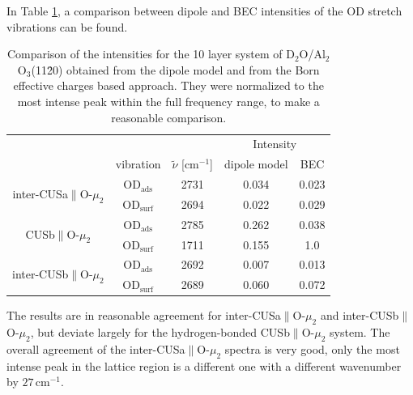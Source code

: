 \documentclass[11pt,DIV=13,BCOR=5mm,a4paper,headinclude]{scrbook}
\begin{document}
In Table \ref{tab:freq_lowcov_comp}, a comparison between dipole and BEC intensities of the OD stretch vibrations can be found.
\begin{table}[!h]
\centering
\caption{Comparison of the intensities for the 10 layer system of D$_2$O/Al$_2$O$_3$(11\=20) obtained from the dipole model and from the Born effective charges based approach.
They were normalized to the most intense peak within the full frequency range, to make a reasonable comparison.}
\begin{tabular}{ccc|cc}
\toprule
&&&\multicolumn{2}{c}{Intensity}\\
&vibration&$\tilde{\nu}$ [cm$^{-1}$]& dipole model & BEC \\\midrule
\multirow{2}{3cm}{inter-CUSa$\parallel$O-$ \mu_2$}&OD$_\textrm{ads}$&2731 &0.034 &0.023 \\
 &OD$_\textrm{surf}$&2694&0.022 &0.029 \\\hline
\multirow{2}{3cm}{CUSb$\parallel$O-$ \mu_2$}&OD$_\textrm{ads}$ & 2785&0.262 &0.038 \\
 &OD$_\textrm{surf}$& 1711& 0.155&1.0 \\\hline
\multirow{2}{3cm}{inter-CUSb$\parallel$O-$ \mu_2$}&OD$_\textrm{ads}$& 2692& 0.007&0.013 \\
 &OD$_\textrm{surf}$& 2689& 0.060& 0.072\\\bottomrule
\end{tabular}
\label{tab:freq_lowcov_comp}
\end{table}
The results are in reasonable agreement for inter-CUSa$\parallel$O-$ \mu_2$ and inter-CUSb$\parallel$O-$ \mu_2$, but deviate largely for the hydrogen-bonded CUSb$\parallel$O-$ \mu_2$ system.
The overall agreement of the inter-CUSa$\parallel$O-$\mu_2$ spectra is very good, only the most intense peak in the lattice region is a different one with a different wavenumber by $27\,$cm$^{-1}$.
\end{document}

